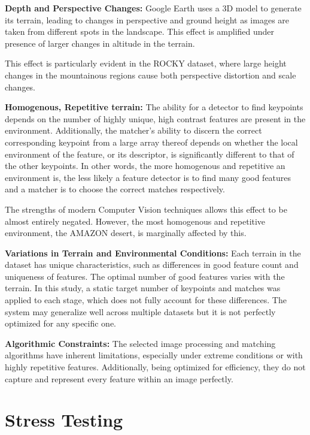 \textbf{Depth and Perspective Changes:} Google Earth uses a 3D model to generate its terrain, leading to changes in perspective and ground height as images are taken from different spots in the landscape. This effect is amplified under presence of larger changes in altitude in the terrain.

This effect is particularly evident in the ROCKY dataset, where large height changes in the mountainous regions cause both perspective distortion and scale changes.

\textbf{Homogenous, Repetitive terrain:} The ability for a detector to find keypoints depends on the number of highly unique, high contrast features are present in the environment. Additionally, the matcher's ability to discern the correct corresponding keypoint from a large array thereof depends on whether the local environment of the feature, or its descriptor, is significantly different to that of the other keypoints. In other words, the more homogenous and repetitive an environment is, the less likely a feature detector is to find many good features and a matcher is to choose the correct matches respectively. 

The strengths of modern Computer Vision techniques allows this effect to be almost entirely negated. However, the most homogenous and repetitive environment, the AMAZON desert, is marginally affected by this. 

\textbf{Variations in Terrain and Environmental Conditions:} Each terrain in the dataset has unique characteristics, such as differences in good feature count and uniqueness of features. The optimal number of good features varies with the terrain. In this study, a static target number of keypoints and matches was applied to each stage, which does not fully account for these differences. The system may generalize well across multiple datasets but it is not perfectly optimized for any specific one. 



\textbf{Algorithmic Constraints:} The selected image processing and matching algorithms have inherent limitations, especially under extreme conditions or with highly repetitive features. Additionally, being optimized for efficiency, they do not capture and represent every feature within an image perfectly.


\section{Stress Testing}

